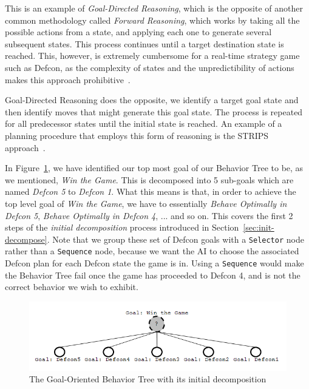         This is an example of \emph{Goal-Directed Reasoning}, which is the opposite of another common methodology called \emph{Forward Reasoning}, which works by taking all the possible actions from a state, and applying each one to generate several subsequent states. This process continues until a target destination state is reached. This, however, is extremely cumbersome for a real-time strategy game such as Defcon, as the complexity of states and the unpredictibility of actions makes this approach prohibitive~\cite{goal-directed-reasoning}. 
        
        Goal-Directed Reasoning does the opposite, we identify a target goal state and then identify moves that might generate this goal state. The process is repeated for all predecessor states until the initial state is reached. An example of a planning procedure that employs this form of reasoning is the STRIPS approach~\cite{strips}.
        
        In Figure~\ref{img:deftoplevel}, we have identified our top most goal of our Behavior Tree to be, as we mentioned, \emph{Win the Game}. This is decomposed into 5 sub-goals which are named \emph{Defcon 5} to \emph{Defcon 1}. What this means is that, in order to achieve the top level goal of \emph{Win the Game}, we have to essentially \emph{Behave Optimally in Defcon 5}, \emph{Behave Optimally in Defcon 4}, ... and so on. This covers the first 2 steps of the \emph{initial decomposition} process introduced in Section~\ref{sec:init-decompose}. Note that we group these set of Defcon goals with a \texttt{Selector} node rather than a \texttt{Sequence} node, because we want the AI to choose the associated Defcon plan for each Defcon state the game is in. Using a \texttt{Sequence} would make the Behavior Tree fail once the game has proceeded to Defcon 4, and is not the correct behavior we wish to exhibit.
        
        \begin{figure}[h]                
            \begin{center}
            \includegraphics[scale=0.5]{images/defhighlevel.png}
            \caption{The Goal-Oriented Behavior Tree with its initial decomposition }
            \label{img:deftoplevel}
            \end{center}            
        \end{figure}
        
